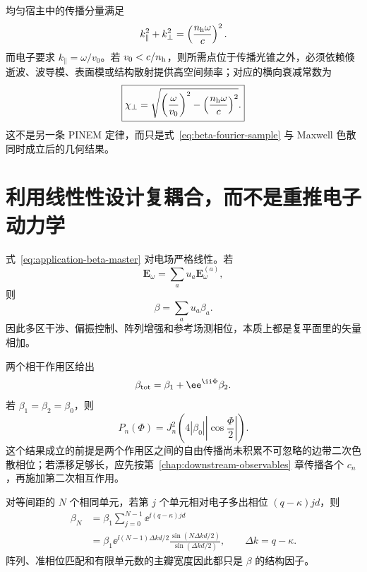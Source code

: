 均匀宿主中的传播分量满足
\begin{equation}
k_\parallel^2+k_\perp^2=\left(\frac{n_{\rm h}\omega}{c}\right)^2.
\end{equation}
而电子要求 \(k_\parallel=\omega/v_0\)。若 \(v_0<c/n_{\rm h}\)，则所需点位于传播光锥之外，必须依赖倏逝波、波导模、表面模或结构散射提供高空间频率；对应的横向衰减常数为
\begin{equation}
\boxed{
\chi_\perp
=\sqrt{\left(\frac{\omega}{v_0}\right)^2
-\left(\frac{n_{\rm h}\omega}{c}\right)^2}.}
\label{eq:evanescent-decay-from-kinematics}
\end{equation}
这不是另一条 PINEM 定律，而只是式~\eqref{eq:beta-fourier-sample} 与 Maxwell 色散同时成立后的几何结果。

\section{利用线性性设计复耦合，而不是重推电子动力学}

式~\eqref{eq:application-beta-master} 对电场严格线性。若
\begin{equation}
\bm E_\omega=\sum_a u_a\bm E_\omega^{(a)},
\end{equation}
则
\begin{equation}
\boxed{\beta=\sum_a u_a\beta_a.}
\label{eq:beta-linearity-superposition}
\end{equation}
因此多区干涉、偏振控制、阵列增强和参考场测相位，本质上都是复平面里的矢量相加。

两个相干作用区给出
\begin{equation}
\beta_{\rm tot}=\beta_1+\ee^{\ii\Phi}\beta_2.
\label{eq:two-zone-beta}
\end{equation}
若 \(\beta_1=\beta_2=\beta_0\)，则
\begin{equation}
\boxed{
P_n(\Phi)
=J_n^2\!\left(4|\beta_0|\left|\cos\frac{\Phi}{2}\right|\right).}
\label{eq:two-zone-pinem-interference}
\end{equation}
这个结果成立的前提是两个作用区之间的自由传播尚未积累不可忽略的边带二次色散相位；若漂移足够长，应先按第~\ref{chap:downstream-observables} 章传播各个 \(c_n\)，再施加第二次相互作用。

对等间距的 \(N\) 个相同单元，若第 \(j\) 个单元相对电子多出相位 \((q-\kappa)jd\)，则
\begin{align}
\beta_N
&=\beta_1\sum_{j=0}^{N-1}\ee^{\ii(q-\kappa)jd}\\
&=\boxed{
\beta_1\ee^{\ii(N-1)\Delta kd/2}
\frac{\sin(N\Delta kd/2)}{\sin(\Delta kd/2)}},
\qquad \Delta k=q-\kappa.
\label{eq:array-beta-sinc}
\end{align}
阵列、准相位匹配和有限单元数的主瓣宽度因此都只是 \(\beta\) 的结构因子。

